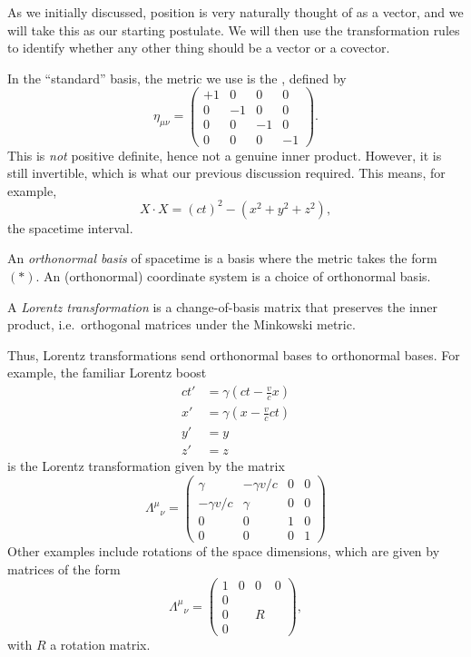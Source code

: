 \documentclass[a4paper]{article}
\begin{document}
As we initially discussed, position is very naturally thought of as a vector, and we will take this as our starting postulate. We will then use the transformation rules to identify whether any other thing should be a vector or a covector.

In the ``standard'' basis, the metric we use is the , defined by
\[
  \eta_{\mu\nu} =
  \begin{pmatrix}
    +1 & 0 & 0 & 0\\
    0 & -1 & 0 & 0\\
    0 & 0 & -1 & 0\\
    0 & 0 & 0 & -1
  \end{pmatrix}.\tag{$*$}
\]
This is \emph{not} positive definite, hence not a genuine inner product. However, it is still invertible, which is what our previous discussion required. This means, for example,
\[
  X \cdot X = (ct)^2 - (x^2 + y^2 + z^2),
\]
the spacetime interval.

\begin{defi}
  An \emph{orthonormal basis} of spacetime is a basis where the metric takes the form $(*)$. An (orthonormal) coordinate system is a choice of orthonormal basis.
\end{defi}

\begin{defi}
  A \emph{Lorentz transformation} is a change-of-basis matrix that preserves the inner product, i.e.\ orthogonal matrices under the Minkowski metric.
\end{defi}
Thus, Lorentz transformations send orthonormal bases to orthonormal bases. For example, the familiar Lorentz boost
\begin{align*}
  ct' &= \gamma\left(ct - \frac{v}{c}x\right)\\
  x' &= \gamma\left(x - \frac{v}{c}ct\right)\\
  y' &= y\\
  z' &= z
\end{align*}
is the Lorentz transformation given by the matrix
\[
  \Lambda^\mu\!_\nu =
  \begin{pmatrix}
    \gamma & -\gamma v/c & 0 &0\\
    -\gamma v/c & \gamma & 0 & 0\\
    0 & 0 & 1 & 0\\
    0 & 0 & 0 & 1
  \end{pmatrix}
\]
Other examples include rotations of the space dimensions, which are given by matrices of the form
\[
  \Lambda^\mu\!_\nu =
  \begin{pmatrix}
    1 & 0 & 0 & 0\\
    0 & \\
    0 & & R \\
    0
  \end{pmatrix},
\]
with $R$ a rotation matrix.
\end{document}
